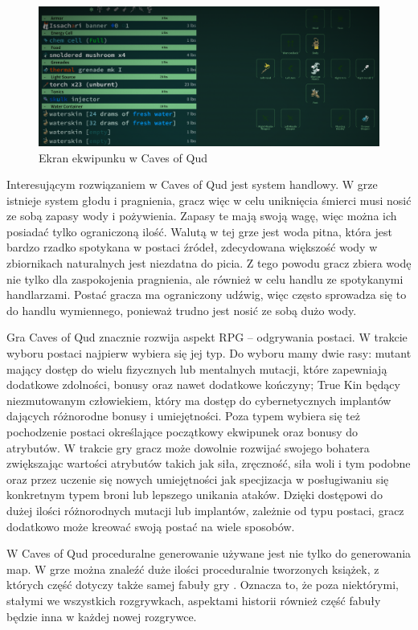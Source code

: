 \documentclass[12pt,twoside]{article}
\begin{document}
\FloatBarrier
\begin{figure}[h]
	\centering
	\includegraphics[width=14cm]{images/caves_of_qud/scr2.png}
	\caption{Ekran ekwipunku w Caves of Qud}
	\label{CoQ:scr2}
\end{figure}
\FloatBarrier

Interesującym rozwiązaniem w Caves of Qud jest system handlowy. W grze istnieje system głodu i pragnienia, gracz więc w celu uniknięcia śmierci musi nosić ze sobą zapasy wody i pożywienia. Zapasy te mają swoją wagę, więc można ich posiadać tylko ograniczoną ilość. Walutą w tej grze jest woda pitna, która jest bardzo rzadko spotykana w postaci źródeł, zdecydowana większość wody w zbiornikach naturalnych jest niezdatna do picia. Z tego powodu gracz zbiera wodę nie tylko dla zaspokojenia pragnienia, ale również w celu handlu ze spotykanymi handlarzami. Postać gracza ma ograniczony udźwig, więc często sprowadza się to do handlu wymiennego, ponieważ trudno jest nosić ze sobą dużo wody.

Gra Caves of Qud znacznie rozwija aspekt RPG -- odgrywania postaci. W trakcie wyboru postaci najpierw wybiera się jej typ. Do wyboru mamy dwie rasy: mutant mający dostęp do wielu fizycznych lub mentalnych mutacji, które zapewniają dodatkowe zdolności, bonusy oraz nawet dodatkowe kończyny; True Kin będący niezmutowanym człowiekiem, który ma dostęp do cybernetycznych implantów dających różnorodne bonusy i umiejętności. Poza typem wybiera się też pochodzenie postaci określające początkowy ekwipunek oraz bonusy do atrybutów. W trakcie gry gracz może dowolnie rozwijać swojego bohatera zwiększając wartości atrybutów takich jak siła, zręczność, siła woli i tym podobne oraz przez uczenie się nowych umiejętności jak specjizacja w posługiwaniu się konkretnym typem broni lub lepszego unikania ataków. Dzięki dostępowi do dużej ilości różnorodnych mutacji lub implantów, zależnie od typu postaci, gracz dodatkowo może kreować swoją postać na wiele sposobów.

W Caves of Qud proceduralne generowanie używane jest nie tylko do generowania map. W grze można znaleźć duże ilości proceduralnie tworzonych książek, z których część dotyczy także samej fabuły gry \cite{coq_history}. Oznacza to, że poza niektórymi, stałymi we wszystkich rozgrywkach, aspektami historii również część fabuły będzie inna w każdej nowej rozgrywce.
\end{document}
